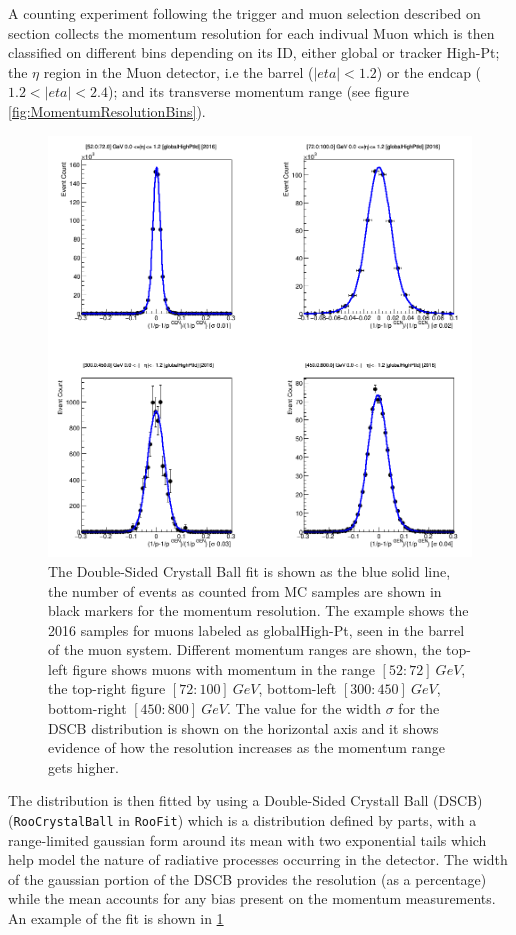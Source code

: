 A counting experiment following the trigger and muon selection described on
section %
collects the momentum resolution for each indivual Muon which is then classified
on different bins depending on its ID, either global or tracker High-Pt; the $\eta$
region in the Muon detector, i.e the barrel ($\lvert eta\lvert< 1.2$) or
the endcap ($1.2 < \lvert eta \lvert < 2.4$); and its transverse momentum range
(see figure \ref{fig:MomentumResolutionBins}).


\begin{figure}[tph]
  \centering
  \includegraphics[width=.7\textwidth]{fig/MomentumResolution/DSCB_Example.png}
  \caption{
    The Double-Sided Crystall Ball fit is shown as the blue solid line,
    the number of events as counted from MC samples are shown in black markers for
    the momentum resolution. The example shows the 2016 samples for muons labeled
    as globalHigh-Pt, seen in the barrel of the muon system. Different momentum
    ranges are shown, the
    top-left figure shows muons with momentum in the range $[52:72]~GeV$,
    the top-right figure $[72:100]~GeV$, bottom-left $[300:450]~GeV$,
    bottom-right $[450:800]~GeV$. The value for the width $\sigma$ for the DSCB
    distribution is shown on the horizontal axis and it shows evidence of how
    the resolution increases as the momentum range gets higher.
  }
  \label{fig:DSCB_Fit_Example}
\end{figure}

The distribution is then fitted by using a Double-Sided Crystall Ball (DSCB)
(\verb|RooCrystalBall| in \verb|RooFit|) which is a distribution defined
by parts, with a range-limited gaussian form around its mean with two
exponential tails which help model the nature of radiative processes occurring in
the detector. The width of the gaussian portion of the DSCB provides the
resolution (as a percentage) while the mean accounts for any bias present on the
momentum measurements. An example of the fit is shown in \ref{fig:DSCB_Fit_Example}

